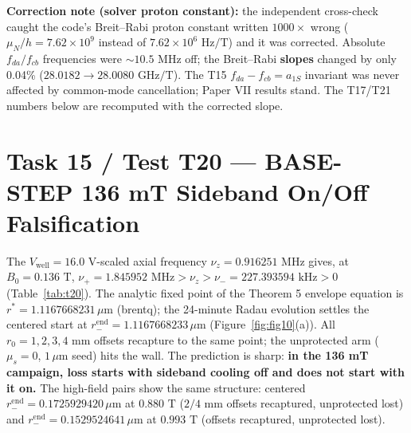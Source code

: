 \documentclass[12pt,a4paper]{article}
\begin{document}
\textbf{Correction note (solver proton constant):} the independent cross-check caught the code's Breit--Rabi proton constant written $1000\times$ wrong ($\mu_{N}/h = 7.62\times 10^9$ instead of $7.62\times 10^6\text{ Hz/T}$) and it was corrected. Absolute $f_{da}/f_{cb}$ frequencies were $\sim 10.5\text{ MHz}$ off; the Breit--Rabi \textbf{slopes} changed by only 0.04\% ($28.0182\to 28.0080\text{ GHz/T}$). The T15 $f_{da}-f_{cb}=a_{1S}$ invariant was never affected by common-mode cancellation; Paper VII results stand. The T17/T21 numbers below are recomputed with the corrected slope.

\section[Task 15 / Test T20 --- BASE-STEP 136 mT Sideband On/Off Falsification]{Task 15 / Test T20 --- BASE-STEP 136 mT Sideband On/Off Falsification}

The $V_{\mathrm{well}}=16.0\text{ V}$-scaled axial frequency $\nu_z=0.916251\text{ MHz}$ gives, at $B_0=0.136\text{ T}$, $\nu_+=1.845952\text{ MHz}>\nu_z>\nu_-=227.393594\text{ kHz}>0$ (Table~\ref{tab:t20}). The analytic fixed point of the Theorem 5 envelope equation is $r^*=1.1167668231\,\mu\text{m}$ (brentq); the 24-minute Radau evolution settles the centered start at $r_-^{\mathrm{end}}=1.1167668233\,\mu\text{m}$ (Figure~\ref{fig:fig10}(a)). All $r_0=1,2,3,4\text{ mm}$ offsets recapture to the same point; the unprotected arm ($\mu_s=0$, $1\,\mu\text{m}$ seed) hits the wall. The prediction is sharp: \textbf{in the 136 mT campaign, loss starts with sideband cooling off and does not start with it on.} The high-field pairs show the same structure: centered $r_-^{\mathrm{end}}=0.1725929420\,\mu\text{m}$ at $0.880\text{ T}$ ($2/4\text{ mm}$ offsets recaptured, unprotected lost) and $r_-^{\mathrm{end}}=0.1529524641\,\mu\text{m}$ at $0.993\text{ T}$ (offsets recaptured, unprotected lost).
\end{document}
